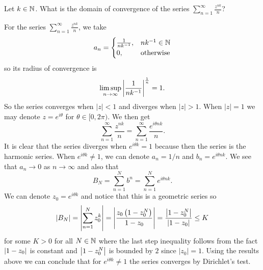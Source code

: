 \documentclass[11pt,a4paper]{article}
\begin{document}
\begin{exercise}
  \label{ex:convergence-radius-2}
  Let $k \in \mathbb{N}$.
  What is the domain of convergence of the series
  $\sum_{n=1}^{\infty} \frac{z^{nk}}{n}$?
\end{exercise}
\begin{solution}
  For the series $\sum_{n=1}^{\infty} \frac{z^{nk}}{n}$,
  we take
  \[
    a_n =
    \begin{cases}
      \frac{1}{n k^{-1}}, &n k^{-1} \in \mathbb{N} \\
      0, &\text{otherwise}
    \end{cases}
  \]
  so its radius of convergence is
  \[
    \limsup_{n \to \infty} \left\lvert\frac{1}{n k^{-1}}\right\rvert^{\frac{1}{n}} = 1.
  \]
  So the series converges when $|z| < 1$ and diverges when $|z| > 1$.
  When $|z| = 1$ we may denote $z = e^{i \theta}$ for $\theta \in [0,2\pi)$.
  We then get
  \[
    \sum_{n=1}^{\infty} \frac{z^{nk}}{n} =
    \sum_{n=1}^{\infty} \frac{e^{i \theta nk}}{n}.
  \]
  It is clear that the series diverges when $e^{i \theta k} = 1$ because
  then the series is the harmonic series.
  When $e^{i \theta k} \neq 1$, we can denote $a_n = 1 / n$
  and $b_n = e^{i \theta n k}$.
  We see that $a_n \to 0$ as $n \to \infty$ and also that
  \[
    B_N =
    \sum_{n=1}^{N} b^n =
    \sum_{n=1}^{N} e^{i \theta nk}.
  \]
  We can denote $z_0 = e^{i \theta k}$ and notice that this is a geometric
  series so
  \[
    \abs{B_N} =
    \abs{\sum_{n=1}^{N} z_0^{k}} =
    \abs{\frac{z_0 \del{1 - z_0^N}}{1 - z_0}} =
  \frac{\abs{1 - z_0^N}}{{\abs{1 - z_0}}} \le K
  \]
  for some $K > 0$ for all $N \in \mathbb{N}$
  where the last step inequality follows from the fact $\left\lvert1 - z_0\right\rvert$
  is constant and $\left\lvert1 - z_0^N\right\rvert$ is bounded by $2$ since $|z_0| = 1$.
  Using the results above we can conclude that for $e^{i \theta k} \neq 1$
  the series converges by Dirichlet's test.
\end{solution}
\end{document}
